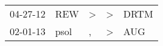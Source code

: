\begin{supertabular}{lllll}
 04-27-12 &   REW &  \textgreater &  \textgreater &  DRTM \\
 02-01-13 &  psol &             , &  \textgreater &   AUG \\
\end{supertabular}

